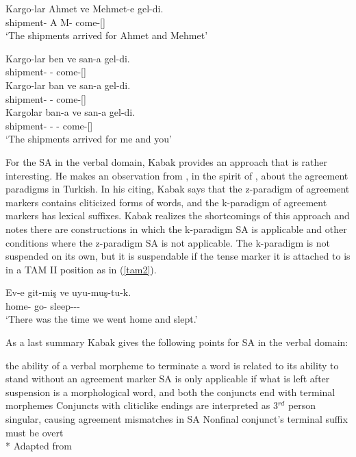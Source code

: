 \begin{exe}
\ex \label{kabakphonology}
\begin{xlist}
\ex \gll Kargo-lar Ahmet ve Mehmet-e gel-di. \\ 
shipment-{\Pl} A {\And} M-{\Dat} come-{\Pst}[{\Tsg}] \\
\glt `The shipments arrived for Ahmet and Mehmet'

\ex \gll *Kargo-lar ben ve san-a gel-di. \\ 
shipment-{\Pl} {\Fsg} {\And} {\Ssg}-{\Dat} come-{\Pst}[{\Tsg}] \\

\ex \gll *Kargo-lar ban ve san-a gel-di. \\ 
shipment-{\Pl} {\Fsg} {\And} {\Ssg}-{\Dat} come-{\Pst}[{\Tsg}] \\

\ex \gll 
Kargolar ban-a ve san-a gel-di. \\ 
shipment-{\Pl} {\Fsg}-{\Dat} {\And} {\Ssg}-{\Dat} come-{\Pst}[{\Tsg}] \\
\glt `The shipments arrived for me and you'
\end{xlist}
\end{exe}


For the SA in the verbal domain, Kabak provides an approach that is rather interesting. He makes an observation from \cite{good2005morphosyntax}, in the spirit of \cite{erdal2000clitics}, about the agreement paradigms in Turkish. In his citing, Kabak says that the z-paradigm of agreement markers contains cliticized forms of words, and the k-paradigm of agreement markers has lexical suffixes. Kabak realizes the shortcomings of this approach and notes there are constructions in which the k-paradigm SA is applicable and other conditions where the z-paradigm SA is not applicable. The k-paradigm is not suspended on its own, but it is suspendable if the tense marker it is attached to is in a TAM II position as in (\ref{tam2}).

\begin{exe}
\ex \label{tam2} 
\gll Ev-e git-miş ve uyu-muş-tu-k. \\ 
home-{\Dat} go-{\Evi} {\And} sleep-{\Evi}-{\Pst}-{\Fpl} \\
\glt `There was the time we went home and slept.'
\end{exe}

As a last summary Kabak gives the following points for SA in the verbal domain:
\begin{exe}
\sn \begin{xlisti}
    \ex the ability of a verbal morpheme to terminate a word is related to its ability to stand without an agreement marker
    \ex SA is only applicable if what is left after suspension is a morphological word, and both the conjuncts end with terminal morphemes
    \ex Conjuncts with cliticlike endings are interpreted as 3$^{rd}$ person singular, causing agreement mismatches in SA
    \ex Nonfinal conjunct's terminal suffix must be overt\\*
    \hfill Adapted from \cite{kabak2007turkish}
    \end{xlisti}
\end{exe}

